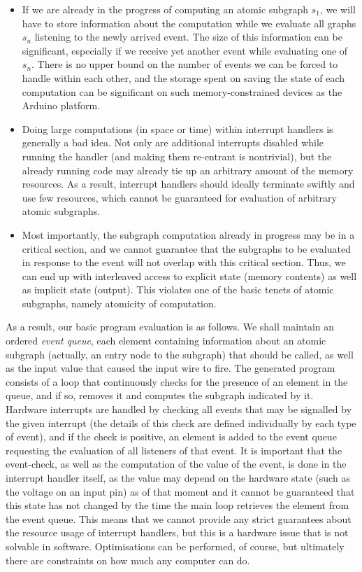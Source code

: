 \documentclass[a4paper, oneside, final]{memoir}
\begin{document}
\begin{itemize}
\item If we are already in the progress of computing an atomic
  subgraph $s_1$, we will have to store information about the
  computation while we evaluate all graphs $s_n$ listening to the
  newly arrived event.  The size of this information can be
  significant, especially if we receive yet another event while
  evaluating one of $s_n$.  There is no upper bound on the number of
  events we can be forced to handle within each other, and the storage
  spent on saving the state of each computation can be significant on
  such memory-constrained devices as the Arduino platform.
\item Doing large computations (in space or time) within interrupt
  handlers is generally a bad idea.  Not only are additional
  interrupts disabled while running the handler (and making them
  re-entrant is nontrivial), but the already running code may already
  tie up an arbitrary amount of the memory resources.  As a result,
  interrupt handlers should ideally terminate swiftly and use few
  resources, which cannot be guaranteed for evaluation of arbitrary
  atomic subgraphs.
\item Most importantly, the subgraph computation already in progress
  may be in a critical section, and we cannot guarantee that the
  subgraphs to be evaluated in response to the event will not overlap
  with this critical section.  Thus, we can end up with interleaved
  access to explicit state (memory contents) as well as implicit state
  (output).  This violates one of the basic tenets of atomic
  subgraphs, namely atomicity of computation.
\end{itemize}

As a result, our basic program evaluation is as follows.  We shall
maintain an ordered \textit{event queue}, each element containing
information about an atomic subgraph (actually, an entry node to the
subgraph) that should be called, as well as the input value that
caused the input wire to fire.  The generated program consists of a
loop that continuously checks for the presence of an element in the
queue, and if so, removes it and computes the subgraph indicated by
it.  Hardware interrupts are handled by checking all events that may
be signalled by the given interrupt (the details of this check are
defined individually by each type of event), and if the check is
positive, an element is added to the event queue requesting the
evaluation of all listeners of that event.  It is important that the
event-check, as well as the computation of the value of the event, is
done in the interrupt handler itself, as the value may depend on the
hardware state (such as the voltage on an input pin) as of that
moment and it cannot be guaranteed that this state has not
changed by the time the main loop retrieves the element from the event
queue.  This means that we cannot provide any strict guarantees about
the resource usage of interrupt handlers, but this is a hardware issue
that is not solvable in software.  Optimisations can be performed, of
course, but ultimately there are constraints on how much any computer
can do.
\end{document}

